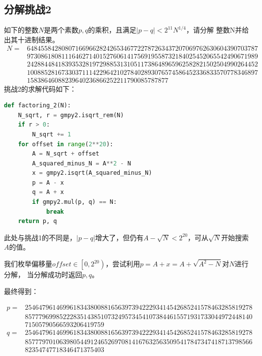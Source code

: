 \subsection{分解挑战2}

如下的整数$N$是两个素数$p,q$的乘积，且满足$|p-q|<2^{11}N^{1/4}$，请分解
整数N并给出其十进制结果。\\

$
\begin{aligned}
    N = &6484558428080716696628242653467722787263437207069762630604390703787\\
        & 9730861808111646271401527606141756919558732184025452065542490671989 \\
        & 2428844841839353281972988531310511738648965962582821502504990264452 \\
        & 1008852816733037111422964210278402893076574586452336833570778346897 \\
        & 15838646088239640236866252211790085787877
\end{aligned}
$\\

挑战2的求解代码如下：
\begin{lstlisting}[language = Python]
def factoring_2(N):
    N_sqrt, r = gmpy2.isqrt_rem(N)
    if r > 0:
        N_sqrt += 1
    for offset in range(2**20):
        A = N_sqrt + offset
        A_squared_minus_N = A**2 - N
        x = gmpy2.isqrt(A_squared_minus_N)
        p = A - x
        q = A + x
        if gmpy2.mul(p, q) == N:
            break
    return p, q
\end{lstlisting}

此处与挑战1的不同是，$|p-q|$增大了，但仍有$A-\sqrt{N}< 2^20$，可从$\sqrt{N}$开始搜索$A$的值。

我们枚举偏移量$offset \in \left[0, 2^{20}\right)$，尝试利用$p=A+x=A+\sqrt{A^2-N}$对$N$进行分解，
当分解成功时返回$p,q$。

最终得到：

$
\begin{aligned}
    p = &254647961469961834380088165639739422293414542685241578463285819278\\
        &857779699852228351438510732495734541073844615571931733044972448140\\
        &71505790566593206419759\\
    q = &254647961469961834380088165639739422293414542685241578463285819278\\
        &857779701063980544912465269708141676325635095417847347418713798566\\
        &82354747718346471375403
\end{aligned}
$\\

